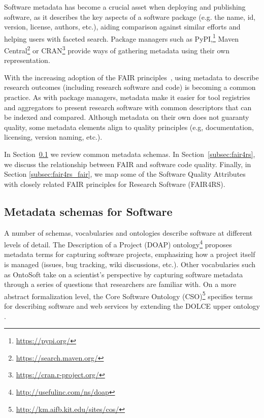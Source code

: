 
Software metadata has become a crucial asset when deploying and publishing software, as it describes the key aspects of a software package (e.g. the name, id, version, license, authors, etc.), aiding comparison against similar efforts and helping users with faceted search. Package managers such as PyPI,\footnote{\url{https://pypi.org/}} Maven Central\footnote{\url{https://search.maven.org/}} or CRAN\footnote{\url{https://cran.r-project.org/}} provide ways of gathering metadata using their own  representation.

With the increasing adoption of the FAIR principles~\cite{wilkinson_fair_2016}, using metadata to describe research outcomes (including research software and code) is becoming a common practice. As with package managers, metadata make it easier for tool registries and aggregators to present research software with common descriptors that can be indexed and compared. Although metadata on their own does not guaranty quality, some metadata elements align to quality principles (e.g, documentation, licensing, version naming, etc.).

In Section~\ref{subsec:schemas} we review common metadata schemas. In Section~\ref{subsec:fair4rs}, we discuss the relationship between FAIR and software code quality. Finally, in Section \ref{subsec:fair4rs_fair}, we map some of the Software Quality Attributes with closely related FAIR principles for Research Software (FAIR4RS).

\subsection{Metadata schemas for Software}
\label{subsec:schemas}

A number of schemas, vocabularies and ontologies describe software at different levels of detail. The Description of a Project (DOAP) ontology\footnote{\url{http://usefulinc.com/ns/doap}} proposes metadata terms for capturing software projects, emphasizing how a project itself is managed (issues, bug tracking, wiki discussions, etc.). Other vocabularies such as OntoSoft \cite{gil2016ontosoft} take on a scientist's perspective by capturing software metadata through a series of questions that researchers are familiar with. On a more abstract formalization level, the Core Software Ontology (CSO)\footnote{\url{http://km.aifb.kit.edu/sites/cos/}} specifies terms for describing software and web services by extending the DOLCE upper ontology \cite{gangemi2002sweetening}.

